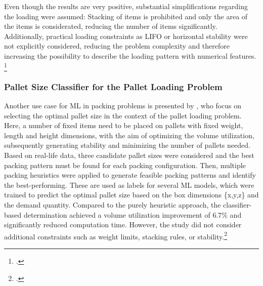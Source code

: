 Even though the results are very positive, substantial simplifications regarding the loading were assumed: Stacking
of items is prohibited and only the area of the items is considerated, reducing the number of items significantly.
Additionally, practical loading constraints as \gls{LIFO} or horizontal stability
were not explicitly considered, reducing the problem complexity and therefore increasing the possibility to describe
the loading pattern with numerical features. \footcite[cf.][]{zhang_learning-based_2022}

\subsubsection{Pallet Size Classifier for the Pallet Loading Problem}
Another use case for \gls{ML} in packing problems is presented by \textcite{aylak_application_2021},
who focus on selecting the optimal pallet size in the context of the pallet loading problem. Here, a number of fixed items
need to be placed on pallets with fixed weight, length and height dimensions, with the aim of optimizing the volume utilization,
subsequently generating stability and minimizing the number of pallets needed. Based on real-life data,
three candidate pallet sizes were considered and the best packing pattern must be found for each packing
configuration. Then, multiple packing heuristics were applied to
generate feasible packing patterns and identify the best-performing. These are used as labels for several
\gls{ML} models, which were trained to predict the optimal pallet size based on the box
dimensions \{x,y,z\} and the demand quantity. Compared to the purely heuristic approach, the classifier-based
determination achieved a volume utilization improvement of $6.7\%$ and significantly reduced computation time.
However, the study did not consider additional constraints such as weight limits, stacking rules, or stability.\footcite[cf.][pp. 12--14]{aylak_application_2021}

